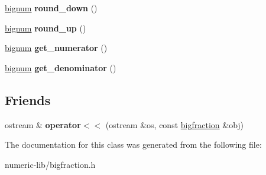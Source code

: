\begin{DoxyCompactItemize}
\item 
\hypertarget{classbigfraction_a92cf19988cc969de82148982dda7878a}{\hyperlink{classbignum}{bignum} {\bfseries round\-\_\-down} ()}\label{classbigfraction_a92cf19988cc969de82148982dda7878a}

\item 
\hypertarget{classbigfraction_ae609f16fb3787df33152c70aafa24a38}{\hyperlink{classbignum}{bignum} {\bfseries round\-\_\-up} ()}\label{classbigfraction_ae609f16fb3787df33152c70aafa24a38}

\item 
\hypertarget{classbigfraction_ae9c500a33c81a80fb5e9c53e322ee111}{\hyperlink{classbignum}{bignum} {\bfseries get\-\_\-numerator} ()}\label{classbigfraction_ae9c500a33c81a80fb5e9c53e322ee111}

\item 
\hypertarget{classbigfraction_adc6d2c5ffa0e2bf49410a5dcfc510070}{\hyperlink{classbignum}{bignum} {\bfseries get\-\_\-denominator} ()}\label{classbigfraction_adc6d2c5ffa0e2bf49410a5dcfc510070}

\end{DoxyCompactItemize}
\subsection*{\-Friends}
\begin{DoxyCompactItemize}
\item 
\hypertarget{classbigfraction_a5077af175d27eae5a8f8bd6ed6479f18}{ostream \& {\bfseries operator$<$$<$} (ostream \&os, const \hyperlink{classbigfraction}{bigfraction} \&obj)}\label{classbigfraction_a5077af175d27eae5a8f8bd6ed6479f18}

\end{DoxyCompactItemize}


\-The documentation for this class was generated from the following file\-:\begin{DoxyCompactItemize}
\item 
numeric-\/lib/bigfraction.\-h\end{DoxyCompactItemize}
